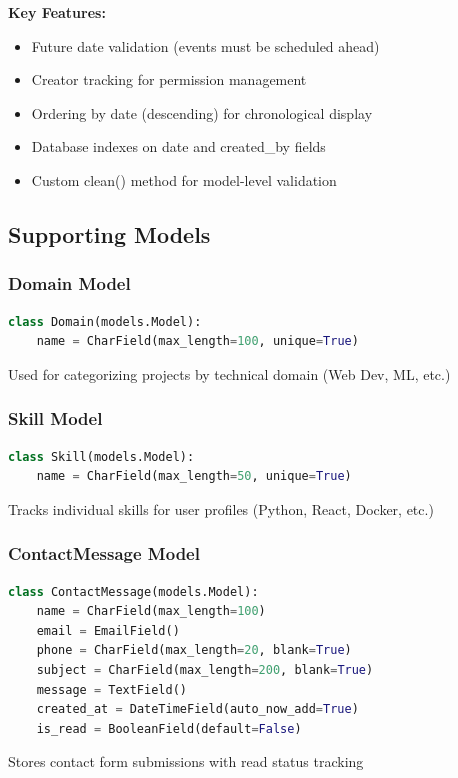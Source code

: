 \documentclass[11pt,a4paper]{article}
\begin{document}
\textbf{Key Features:}
\begin{itemize}[leftmargin=*]
    \item Future date validation (events must be scheduled ahead)
    \item Creator tracking for permission management
    \item Ordering by date (descending) for chronological display
    \item Database indexes on date and created\_by fields
    \item Custom clean() method for model-level validation
\end{itemize}

\subsection{Supporting Models}

\subsubsection{Domain Model}
\begin{lstlisting}[language=Python]
class Domain(models.Model):
    name = CharField(max_length=100, unique=True)
\end{lstlisting}
Used for categorizing projects by technical domain (Web Dev, ML, etc.)

\subsubsection{Skill Model}
\begin{lstlisting}[language=Python]
class Skill(models.Model):
    name = CharField(max_length=50, unique=True)
\end{lstlisting}
Tracks individual skills for user profiles (Python, React, Docker, etc.)

\subsubsection{ContactMessage Model}
\begin{lstlisting}[language=Python]
class ContactMessage(models.Model):
    name = CharField(max_length=100)
    email = EmailField()
    phone = CharField(max_length=20, blank=True)
    subject = CharField(max_length=200, blank=True)
    message = TextField()
    created_at = DateTimeField(auto_now_add=True)
    is_read = BooleanField(default=False)
\end{lstlisting}
Stores contact form submissions with read status tracking
\end{document}
